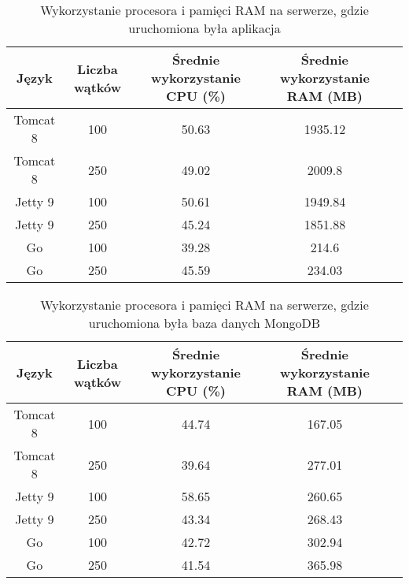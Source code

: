 
\begin{table}[!htb]
\centering
\caption{Wykorzystanie procesora i pamięci RAM na serwerze, gdzie uruchomiona była aplikacja}
\label{tab:app-clean-key}
\begin{tabular}{@{}ccccl@{}}
\toprule
\textbf{Język} & \textbf{Liczba wątków} & \multicolumn{1}{p{3cm}}{\textbf{Średnie wykorzystanie CPU (\%)}} & \multicolumn{1}{p{3cm}}{\textbf{Średnie wykorzystanie RAM (MB)}} &  \\ \midrule
Tomcat 8       & 100                    & 50.63                             & 1935.12                          &  \\
Tomcat 8       & 250                    & 49.02                             & 2009.8                          &  \\
Jetty 9       & 100                    & 50.61                             & 1949.84                          &  \\
Jetty 9       & 250                    & 45.24                             & 1851.88                          &  \\
Go       & 100                    & 39.28                             & 214.6                          &  \\
Go       & 250                    & 45.59                             & 234.03                          &  \\
\bottomrule
\end{tabular}
\end{table}


\begin{table}[!htb]
\centering
\caption{Wykorzystanie procesora i pamięci RAM na serwerze, gdzie uruchomiona była baza danych MongoDB}
\label{tab:mongo-clean-key}
\begin{tabular}{@{}ccccl@{}}
\toprule
\textbf{Język} & \textbf{Liczba wątków} & \multicolumn{1}{p{3cm}}{\textbf{Średnie wykorzystanie CPU (\%)}} & \multicolumn{1}{p{3cm}}{\textbf{Średnie wykorzystanie RAM (MB)}} &  \\ \midrule
Tomcat 8       & 100                    & 44.74                             & 167.05                          &  \\
Tomcat 8       & 250                    & 39.64                             & 277.01                          &  \\
Jetty 9       & 100                    & 58.65                             & 260.65                          &  \\
Jetty 9       & 250                    & 43.34                             & 268.43                          &  \\
Go       & 100                    & 42.72                             & 302.94                          &  \\
Go       & 250                    & 41.54                             & 365.98                          &  \\
\bottomrule
\end{tabular}
\end{table}

